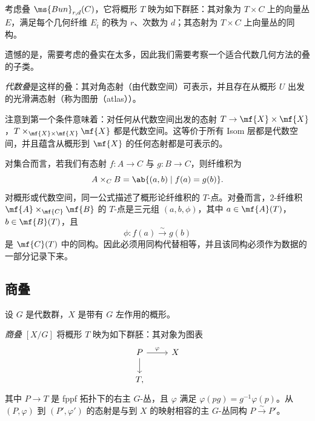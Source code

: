 \begin{exm}
    考虑叠 \(\ms{Bun}_{r,d}(C)\)，它将概形 \(T\) 映为如下群胚：其对象为 \(T\times C\) 上的向量丛 \(E\)，满足每个几何纤维 \(E_{\bar t}\) 的秩为 \(r\)、次数为 \(d\)；其态射为 \(T\times C\) 上向量丛的同构。
\end{exm}

遗憾的是，需要考虑的叠实在太多，因此我们需要考察一个适合代数几何方法的叠的子类。

\begin{defn}
    \textit{代数叠}是这样的叠：其对角态射（由代数空间）可表示，并且存在从概形 \(U\) 出发的光滑满态射（称为图册（atlas））。
\end{defn}

注意到第一个条件意味着：对任何从代数空间出发的态射 \(T \to \mf{X} \times \mf{X}\)，\(T \times_{\mf{X} \times \mf{X}} \mf{X}\) 都是代数空间。这等价于所有 Isom 层都是代数空间，并且蕴含从概形到 \(\mf{X}\) 的任何态射都是可表示的。

\begin{rmk}
    对集合而言，若我们有态射 \(f\colon A\to C\) 与 \(g\colon B\to C\)，则纤维积为
    \[ 
        A\times_C B=\ab\{(a,b)\mid f(a)=g(b)\}. 
    \] 
    对概形或代数空间，同一公式描述了概形论纤维积的 \(T\)-点。对叠而言，\(2\)-纤维积 \(\mf{A}\times_{\mf{C}}\mf{B}\) 的 \(T\)-点是三元组 \((a,b,\phi)\)，其中 \(a\in\mf{A}(T)\)，\(b\in\mf{B}(T)\)，且
    \[ 
        \phi\colon f(a)\xrightarrow{\sim}g(b) 
    \]
    是 \(\mf{C}(T)\) 中的同构。因此必须用同构代替相等，并且该同构必须作为数据的一部分记录下来。
\end{rmk}


\subsection{商叠}%
\label{sub:Quotient stacks}

设 \(G\) 是代数群，\(X\) 是带有 \(G\) 左作用的概形。

\begin{defn}
    \textit{商叠} \([X/G]\) 将概形 \(T\) 映为如下群胚：其对象为图表
    \begin{equation*}
    \begin{tikzcd}
        P \ar{r}{\varphi} \ar{d} & X \\
        T,
    \end{tikzcd}
    \end{equation*}
    其中 \(P\to T\) 是 fppf 拓扑下的右主 \(G\)-丛，且 \(\varphi\) 满足 \(\varphi(pg)=g^{-1}\varphi(p)\)。从 \((P,\varphi)\) 到 \((P',\varphi')\) 的态射是与到 \(X\) 的映射相容的主 \(G\)-丛同构 \(P\xrightarrow{\sim}P'\)。
\end{defn}

